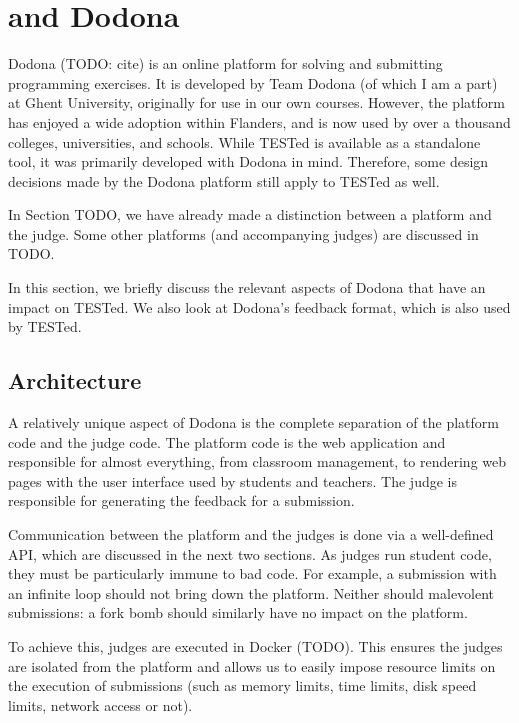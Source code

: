 \documentclass[../main]{subfiles}
\begin{document}
\section{\tested{} and Dodona}\label{sec:tested-and-dodona}

Dodona (TODO: cite) is an online platform for solving and submitting programming exercises.
It is developed by Team Dodona (of which I am a part) at Ghent University, originally for use in our own courses.
However, the platform has enjoyed a wide adoption within Flanders, and is now used by over a thousand colleges, universities, and schools.
While TESTed is available as a standalone tool, it was primarily developed with Dodona in mind.
Therefore, some design decisions made by the Dodona platform still apply to TESTed as well.

In Section TODO, we have already made a distinction between a platform and the judge.
Some other platforms (and accompanying judges) are discussed in TODO.

In this section, we briefly discuss the relevant aspects of Dodona that have an impact on TESTed.
We also look at Dodona's feedback format, which is also used by TESTed.

\subsection{Architecture}

A relatively unique aspect of Dodona is the complete separation of the platform code and the judge code.
The platform code is the web application and responsible for almost everything, from classroom management, to rendering web pages with the user interface used by students and teachers.
The judge is responsible for generating the feedback for a submission.

Communication between the platform and the judges is done via a well-defined API, which are discussed in the next two sections.
As judges run student code, they must be particularly immune to bad code.
For example, a submission with an infinite loop should not bring down the platform.
Neither should malevolent submissions: a fork bomb should similarly have no impact on the platform.

To achieve this, judges are executed in Docker (TODO).
This ensures the judges are isolated from the platform and allows us to easily impose resource limits on the execution of submissions (such as memory limits, time limits, disk speed limits, network access or not).
\end{document}
